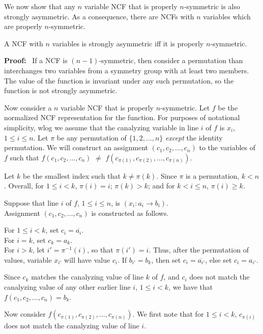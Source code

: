 We now show that any $n$ variable NCF that is properly $n$-symmetric
is also strongly asymmetric.
As a consequence, there are NCFs with $n$ variables
which are properly $n$-symmetric.

\begin{theorem}\label{thm:ncf_strong_asymmetry}
A NCF with $n$ variables is strongly asymmetric iff
it is properly $n$-symmetric.
\end{theorem}

\noindent
\textbf{Proof:}~ 
If a NCF is $(n-1)$-symmetric, then consider a permutation than interchanges two variables 
from a symmetry group with at least two members.
The value of the function is invariant under any such permutation,
so the function is not strongly asymmetric.

Now consider a $n$ variable NCF that is properly $n$-symmetric.
Let $f$ be the normalized NCF representation for the function.
For purposes of notational simplicity, 
wlog we assume that the canalyzing variable in line $i$ of $f$ is $x_i$, $1 \leq i \leq n$.
Let $\pi$ be any permutation of $\{1, 2, \ldots, n\}$
\emph{except} the identity permutation.
We will construct an assignment $(c_1, c_2, \ldots,  c_n)$ 
to the variables of $f$ such that $f(c_1, c_2, \ldots,  c_n)$ $\neq$  
$f(c_{\pi(1)}, c_{\pi(2)}, \ldots, c_{\pi(n)})$.

Let $k$ be the smallest index such that $k \neq \pi(k)$.
Since $\pi$ is a permutation, $k < n$.
Overall, for $1 \leq i < k$, $\pi(i) = i$;
 $\pi(k) > k$;
 and for $k < i \leq n$, $\pi(i) \geq k$.

Suppose that line $i$ of $f$, $1 \leq i \leq n$, is 
\noindent
$(x_i : a_i \rightarrow b_i)$. \\
Assignment $(c_1, c_2, \ldots,  c_n)$ is constructed as follows.

\noindent
For $1 \leq i < k$, set $c_i = \overline{a_i}$. \\
For $i = k$, set $c_k =a_k$. \\
For $i > k$, let $i' = \pi^{-1}(i)$, so that $\pi(i') = i$.
Thus, after the permutation of values, variable $x_{i'}$ will have value $c_i$.
If $b_{i'} = b_k$, then set $c_i =  \overline{a_{i'}}$,
else set $c_i =  a_{i'}$.

Since $c_k$ matches the canalyzing value of line $k$ of $f$,
and $c_i$ does not match the canalyzing value of any other earlier line $i$, $1 \leq i < k$, 
we have that $f(c_1, c_2, \ldots,  c_n) = b_k$.

Now consider $f(c_{\pi(1)}, c_{\pi(2)}, \ldots, c_{\pi(n)})$.
We first note that for $1 \leq i < k$, 
$c_{\pi(i)}$ does not match the canalyzing value of line $i$.


